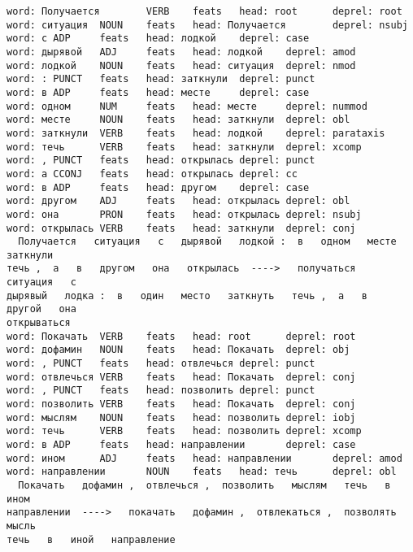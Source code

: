 \documentclass[11pt]{article}
\begin{document}
    \begin{Verbatim}[commandchars=\\\{\}]
word: Получается        VERB    feats   head: root      deprel: root
word: ситуация  NOUN    feats   head: Получается        deprel: nsubj
word: с ADP     feats   head: лодкой    deprel: case
word: дырявой   ADJ     feats   head: лодкой    deprel: amod
word: лодкой    NOUN    feats   head: ситуация  deprel: nmod
word: : PUNCT   feats   head: заткнули  deprel: punct
word: в ADP     feats   head: месте     deprel: case
word: одном     NUM     feats   head: месте     deprel: nummod
word: месте     NOUN    feats   head: заткнули  deprel: obl
word: заткнули  VERB    feats   head: лодкой    deprel: parataxis
word: течь      VERB    feats   head: заткнули  deprel: xcomp
word: , PUNCT   feats   head: открылась deprel: punct
word: а CCONJ   feats   head: открылась deprel: cc
word: в ADP     feats   head: другом    deprel: case
word: другом    ADJ     feats   head: открылась deprel: obl
word: она       PRON    feats   head: открылась deprel: nsubj
word: открылась VERB    feats   head: заткнули  deprel: conj
  Получается   ситуация   с   дырявой   лодкой :  в   одном   месте   заткнули
течь ,  а   в   другом   она   открылась  ---->   получаться   ситуация   с
дырявый   лодка :  в   один   место   заткнуть   течь ,  а   в   другой   она
открываться
word: Покачать  VERB    feats   head: root      deprel: root
word: дофамин   NOUN    feats   head: Покачать  deprel: obj
word: , PUNCT   feats   head: отвлечься deprel: punct
word: отвлечься VERB    feats   head: Покачать  deprel: conj
word: , PUNCT   feats   head: позволить deprel: punct
word: позволить VERB    feats   head: Покачать  deprel: conj
word: мыслям    NOUN    feats   head: позволить deprel: iobj
word: течь      VERB    feats   head: позволить deprel: xcomp
word: в ADP     feats   head: направлении       deprel: case
word: ином      ADJ     feats   head: направлении       deprel: amod
word: направлении       NOUN    feats   head: течь      deprel: obl
  Покачать   дофамин ,  отвлечься ,  позволить   мыслям   течь   в   ином
направлении  ---->   покачать   дофамин ,  отвлекаться ,  позволять   мысль
течь   в   иной   направление
    \end{Verbatim}
\end{document}
